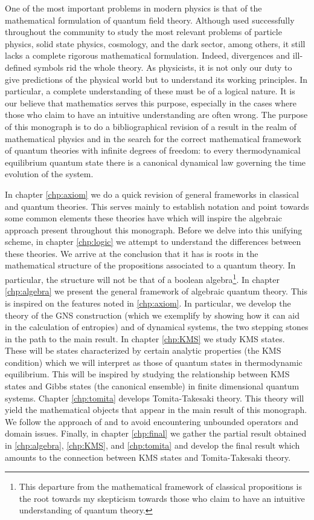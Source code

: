One of the most important problems in modern physics is that of the mathematical formulation of quantum field theory. Although used successfully throughout the community to study the most relevant problems of particle physics, solid state physics, cosmology, and the dark sector, among others, it still lacks a complete rigorous mathematical formulation. Indeed, divergences and ill-defined symbols rid the whole theory. As physicists, it is not only our duty to give predictions of the physical world but to understand its working principles. In particular, a complete understanding of these must be of a logical nature. It is our believe that mathematics serves this purpose, especially in the cases where those who claim to have an intuitive understanding are often wrong. The purpose of this monograph is to do a bibliographical revision of a result in the realm of mathematical physics and in the search for the correct mathematical framework of quantum theories with infinite degrees of freedom: to every thermodynamical equilibrium quantum state there is a canonical dynamical law governing the time evolution of the system.

In chapter \ref{chp:axiom} we do a quick revision of general frameworks in classical and quantum theories. This serves mainly to establish notation and point towards some common elements these theories have which will inspire the algebraic approach present throughout this monograph. Before we delve into this unifying scheme, in chapter \ref{chp:logic} we attempt to understand the differences between these theories. We arrive at the conclusion that it has is roots in the mathematical structure of the propositions associated to a quantum theory. In particular, the structure will not be that of a boolean algebra\footnote{This departure from the mathematical framework of classical propositions is the root towards my skepticism towards those who claim to have an intuitive understanding of quantum theory.}. In chapter \ref{chp:algebra} we present the general framework of algebraic quantum theory. This is inspired on the features noted in \ref{chp:axiom}. In particular, we develop the theory of the GNS construction (which we exemplify by showing how it can aid in the calculation of entropies) and of dynamical systems, the two stepping stones in the path to the main result. In chapter \ref{chp:KMS} we study KMS states. These will be states characterized by certain analytic properties (the KMS condition) which we will interpret as those of quantum states in thermodynamic equilibrium. This will be inspired by studying the relationship between KMS states and Gibbs states (the canonical ensemble) in finite dimensional quantum systems. Chapter \ref{chp:tomita} develops Tomita-Takesaki theory. This theory will yield the mathematical objects that appear in the main result of this monograph. We follow the approach of \cite{Duvenhage1999} and \cite{Rieffel1977} to avoid encountering unbounded operators and domain issues. Finally, in chapter \ref{chp:final} we gather the partial result obtained in \ref{chp:algebra}, \ref{chp:KMS}, and \ref{chp:tomita} and develop the final result which amounts to the connection between KMS states and Tomita-Takesaki theory.  

   